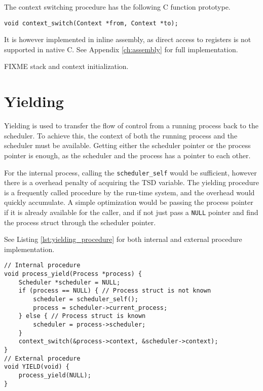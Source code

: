 The context switching procedure has the following C function prototype.

\begin{lstlisting}[style={CustomC},frame={},numbers=none]
void context_switch(Context *from, Context *to);
\end{lstlisting}

It is however implemented in inline assembly, as direct access to registers is not supported in native C. See Appendix \ref{ch:assembly} for full implementation.

FIXME stack and context initialization.

\section{Yielding}

Yielding is used to transfer the flow of control from a running process back to the scheduler. To achieve this, the context of both the running process and the scheduler must be available. Getting either the scheduler pointer or the process pointer is enough, as the scheduler and the process has a pointer to each other. 

For the internal process, calling the \texttt{scheduler\_self} would be sufficient, however there is a overhead penalty of acquiring the TSD variable. The yielding procedure is a frequently called procedure by the run\hyp{}time system, and the overhead would quickly accumulate. A simple optimization would be passing the process pointer if it is already available for the caller, and if not just pass a \texttt{NULL} pointer and find the process struct through the scheduler pointer. 

See Listing \ref{lst:yielding_procedure} for both internal and external procedure implementation.

\begin{lstlisting}[style={CustomC},caption={Internal and external yielding procedure},label={lst:yielding_procedure}]
// Internal procedure
void process_yield(Process *process) {
    Scheduler *scheduler = NULL;
    if (process == NULL) { // Process struct is not known
        scheduler = scheduler_self();
        process = scheduler->current_process;
    } else { // Process struct is known
        scheduler = process->scheduler;
    }
    context_switch(&process->context, &scheduler->context);
}
// External procedure
void YIELD(void) {
    process_yield(NULL);
}
\end{lstlisting}

